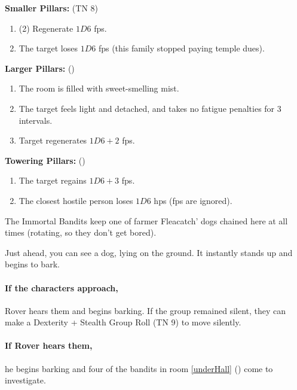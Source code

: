 \textbf{Smaller Pillars:} (TN 8)

\begin{enumerate}
  \item{(2) Regenerate $1D6$ \glspl{fp}.}
  \item{The target loses $1D6$ \glspl{fp} (this family stopped paying temple dues).}
\end{enumerate}

\textbf{Larger Pillars:} (\tn[10])

\begin{enumerate}
  \item
  The room is filled with sweet-smelling mist.
  \item
  The target feels light and detached, and takes no \gls{fatigue} penalties for 3 \glspl{interval}.
  \item
  Target regenerates $1D6+2$ \glspl{fp}.
\end{enumerate}

\textbf{Towering Pillars:} (\tn[12])

\begin{enumerate}
  \item
  The target regains $1D6+3$ \glspl{fp}.
  \item
  The closest hostile person loses $1D6$ \glspl{hp} (\glspl{fp} are ignored).
\end{enumerate}


\begin{exampletext}
  The Immortal Bandits keep one of farmer Fleacatch' dogs chained here at all times (rotating, so they don't get bored).
\end{exampletext}

\begin{boxtext}

  Just ahead, you can see a dog, lying on the ground.
  It instantly stands up and begins to bark.

\end{boxtext}

\paragraph{If the characters approach,}
Rover hears them and begins barking.
If the group remained silent, they can make a Dexterity + Stealth Group Roll (TN 9) to move silently.

\paragraph{If Rover hears them,}
he begins barking and four of the bandits in room \ref{underHall} () come to investigate.

